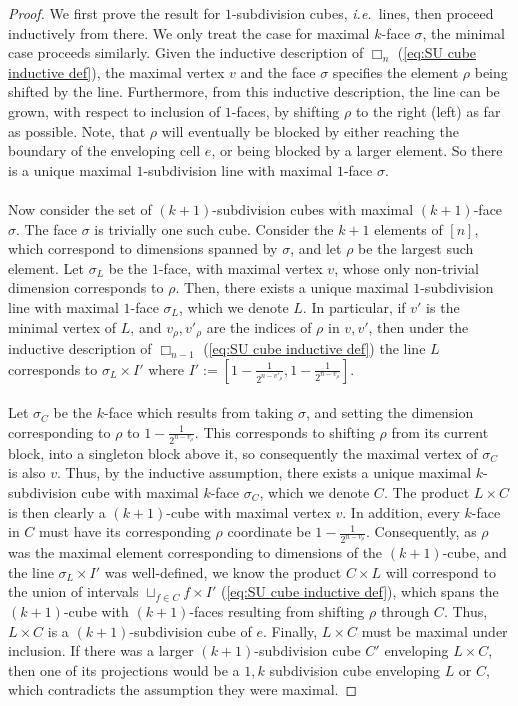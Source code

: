 \documentclass{amsart}
\theoremstyle{definition}
\newcommand{\ie}{\textit{i.e.}~} %
\newcommand{\divcube}[1]{\Box_{#1}}
\begin{document}
\begin{proof}
We first prove the result for $1$-subdivision cubes, \ie lines, then proceed inductively from there.
We only treat the case for maximal $k$-face $\sigma$, the minimal case proceeds similarly.
Given the inductive description of $\divcube{n}$ (\cref{eq:SU cube inductive def}), the maximal vertex $v$ and the face $\sigma$ specifies the element $\rho$ being shifted by the line.
Furthermore, from this inductive description, the line can be grown, with respect to inclusion of $1$-faces, by shifting $\rho$ to the right (left) as far as possible.
Note, that $\rho$ will eventually be blocked by either reaching the boundary of the enveloping cell $e$, or being blocked by a larger element.
So there is a unique maximal $1$-subdivision line with maximal $1$-face $\sigma$.
\\\\
Now consider the set of $(k+1)$-subdivision cubes with maximal $(k+1)$-face $\sigma$.
The face $\sigma$ is trivially one such cube.
Consider the $k+1$ elements of $[n]$, which correspond to dimensions spanned by $\sigma$, and let $\rho$ be the largest such element.
Let $\sigma_L$ be the $1$-face, with maximal vertex $v$, whose only non-trivial dimension corresponds to $\rho$.
Then, there exists a unique maximal $1$-subdivision line with maximal $1$-face $\sigma_L$, which we denote $L$.
In particular, if $v'$ is the minimal vertex of $L$, and $v_\rho, v'_\rho$ are the indices of $\rho$ in $v,v'$, then under the inductive description of $\divcube{n-1}$ (\cref{eq:SU cube inductive def}) the line $L$ corresponds to $\sigma_L \times I'$ where $I':=[1-\frac{1}{2^{n-v'_\rho}},1-\frac{1}{2^{n-v_\rho}}]$.
\\\\
Let $\sigma_C$ be the $k$-face which results from taking $\sigma$, and setting the dimension corresponding to $\rho$ to $1-\frac{1}{2^{n-v_\rho}}$.
This corresponds to shifting $\rho$ from its current block, into a singleton block above it, so consequently the maximal vertex of $\sigma_C$ is also $v$.
Thus, by the inductive assumption, there exists a unique maximal $k$-subdivision cube with maximal $k$-face $\sigma_C$, which we denote $C$.
The product $L\times C$ is then clearly a $(k+1)$-cube with maximal vertex $v$.
In addition, every $k$-face in $C$ must have its corresponding $\rho$ coordinate be $1-\frac{1}{2^{n-v_\rho}}$.
Consequently, as $\rho$ was the maximal element corresponding to dimensions of the $(k+1)$-cube, and the line $\sigma_L \times I'$ was well-defined, we know the product $C\times L$ will correspond to the union of intervals $\sqcup_{f\in C}f \times I'$ (\cref{eq:SU cube inductive def}), which spans the $(k+1)$-cube with $(k+1)$-faces resulting from shifting $\rho$ through $C$.
Thus, $L\times C$ is a $(k+1)$-subdivision cube of $e$.
Finally, $L\times C$ must be maximal under inclusion.
If there was a larger $(k+1)$-subdivision cube $C'$ enveloping $L\times C$, then one of its projections would be a $1,k$ subdivision cube enveloping $L$ or $C$, which contradicts the assumption they were maximal.

\end{proof}
\end{document}
